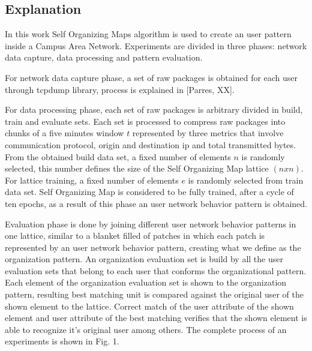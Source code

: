 \documentclass{article}
\begin{document}
\subsection{Explanation} %
In this work Self Organizing Maps algorithm is used to create an user pattern inside a Campus Area Network. Experiments are divided in three phases: network data capture, data processing and pattern evaluation.

For network data capture phase, a set of raw packages is obtained for each user through tcpdump library, process is explained in [Parres, XX].

For data processing phase, each set of raw packages is arbitrary divided in build, train and evaluate sets.
Each set is processed to compress raw packages into chunks of a five minutes window $t$ represented by three metrics that involve communication protocol, origin and destination ip and total transmitted bytes.
From the obtained build data set, a fixed number of elements $n$ is randomly selected, this number defines the size of the Self Organizing Map lattice $(n x n)$.
For lattice training, a fixed number of elements $e$ is randomly selected from train data set. Self Organizing Map is considered to be fully trained, after a cycle of ten epochs, as a result of this phase an user network behavior pattern is obtained.

Evaluation phase is done by joining different user network behavior patterns in one lattice, similar to a blanket filled of patches in which each patch is represented by an user network behavior pattern, creating what we define as the organization pattern. An organization evaluation set is build by all the user evaluation sets that belong to each user that conforms the organizational pattern. Each element of the organization evaluation set is shown to the organization pattern, resulting best matching unit is compared against the original user of the shown element to the lattice. Correct match of the user attribute of the shown element and user attribute of the best matching verifies that the shown element is able to recognize it's original user among others. The complete process of an experiments is shown in Fig. 1.
\end{document}

